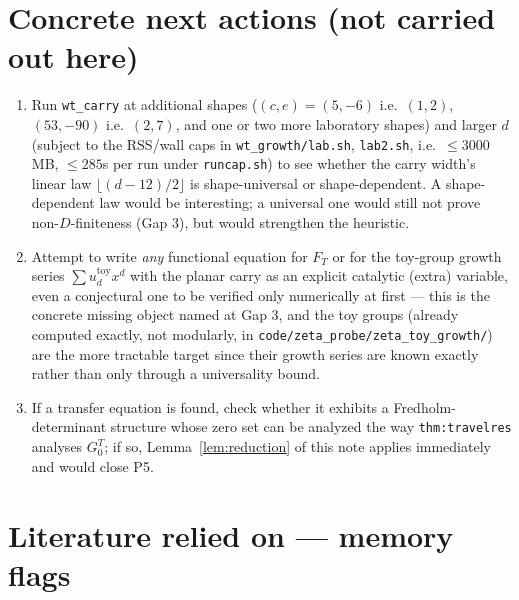 \documentclass[11pt]{article}
\theoremstyle{remark}
\begin{document}
\section{Concrete next actions (not carried out here)}\label{sec:next}
\begin{enumerate}
\item Run \texttt{wt\_carry} at additional shapes ($(c,e)=(5,-6)$ i.e.\ $(1,2)$, $(53,-90)$ i.e.\ $(2,7)$,
and one or two more laboratory shapes) and larger $d$ (subject to the RSS/wall caps in
\texttt{wt\_growth/lab.sh}, \texttt{lab2.sh}, i.e.\ $\le3000$MB, $\le285$s per run under
\texttt{runcap.sh}) to see whether the carry width's linear law $\lfloor(d-12)/2\rfloor$ is
shape-universal or shape-dependent. A shape-dependent law would be interesting; a universal one would
still not prove non-$D$-finiteness (Gap 3), but would strengthen the heuristic.
\item Attempt to write \emph{any} functional equation for $F_T$ or for the toy-group growth series
$\sum u_d^{\mathrm{toy}}x^d$ with the planar carry as an explicit catalytic (extra) variable, even a
conjectural one to be verified only numerically at first — this is the concrete missing object named at
Gap 3, and the toy groups (already computed exactly, not modularly, in
\texttt{code/zeta\_probe/zeta\_toy\_growth/}) are the more tractable target since their growth series are
known exactly rather than only through a universality bound.
\item If a transfer equation is found, check whether it exhibits a Fredholm-determinant structure whose
zero set can be analyzed the way \texttt{thm:travelres} analyses $G^T_0$; if so, Lemma~\ref{lem:reduction}
of this note applies immediately and would close P5.
\end{enumerate}

\section{Literature relied on — memory flags}\label{sec:lit}
\end{document}
